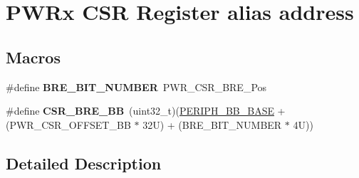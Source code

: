 \hypertarget{group___p_w_r_ex___c_s_r__register__alias}{}\section{P\+W\+Rx C\+SR Register alias address}
\label{group___p_w_r_ex___c_s_r__register__alias}
\subsection*{Macros}
\begin{DoxyCompactItemize}
\item 
\mbox{\label{group___p_w_r_ex___c_s_r__register__alias_gabe84749fda066b71a64a1eec61032181}} 
\#define {\bfseries B\+R\+E\+\_\+\+B\+I\+T\+\_\+\+N\+U\+M\+B\+ER}~P\+W\+R\+\_\+\+C\+S\+R\+\_\+\+B\+R\+E\+\_\+\+Pos
\item 
\mbox{\label{group___p_w_r_ex___c_s_r__register__alias_ga1451a5ec810860a7c2e28c23f0c0e928}} 
\#define {\bfseries C\+S\+R\+\_\+\+B\+R\+E\+\_\+\+BB}~(uint32\+\_\+t)(\mbox{\hyperlink{group___peripheral__memory__map_gaed7efc100877000845c236ccdc9e144a}{P\+E\+R\+I\+P\+H\+\_\+\+B\+B\+\_\+\+B\+A\+SE}} + (P\+W\+R\+\_\+\+C\+S\+R\+\_\+\+O\+F\+F\+S\+E\+T\+\_\+\+BB $\ast$ 32\+U) + (\+B\+R\+E\+\_\+\+B\+I\+T\+\_\+\+N\+U\+M\+B\+E\+R $\ast$ 4\+U))
\end{DoxyCompactItemize}


\subsection{Detailed Description}
